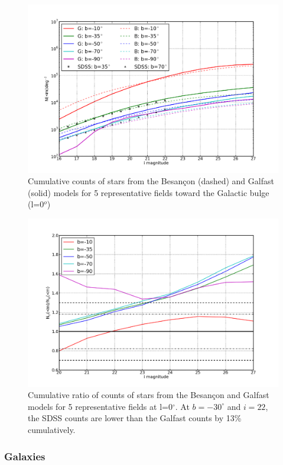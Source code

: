 \documentclass[]{article}
\begin{document}
\begin{figure}[h]
\centering
\includegraphics[width=5in]{validation_figures/cumulative_stars_90_besancon_dust.png}
\caption{Cumulative counts of stars from the Besan\c{c}on (dashed) and Galfast (solid) models for 5 representative fields toward the Galactic bulge (l=0$^o$) \label{fig:scounts_0}}
\end{figure}

\begin{figure}[h]
\centering
\includegraphics[width=5in]{validation_figures/cumulative_ratio_stars_90_besancon_dust.png}
\caption{Cumulative ratio of counts of stars from the Besan\c{c}on and Galfast models for 5 representative fields at l=0$^{\circ}$.  At $b=-30^{\circ}$ and $i=22$, the SDSS counts are lower than the Galfast counts by 13\% cumulatively.\label{fig:sratio_90}}
\end{figure}

\subsubsection{Galaxies \label{sec:galaxycounts}}
\end{document}
